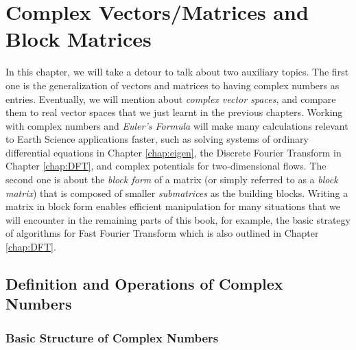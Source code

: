 \chapter{Complex Vectors/Matrices and Block Matrices}
\label{chap:complex}

In this chapter, we will take a detour to talk about two auxiliary topics. The first one is the generalization of vectors and matrices to having complex numbers as entries. Eventually, we will mention about \textit{complex vector spaces}, and compare them to real vector spaces that we just learnt in the previous chapters. Working with complex numbers and \textit{Euler's Formula} will make many calculations relevant to Earth Science applications faster, such as solving systems of ordinary differential equations in Chapter \ref{chap:eigen}, the Discrete Fourier Transform in Chapter \ref{chap:DFT}, and complex potentials for two-dimensional flows. The second one is about the \textit{block form} of a matrix (or simply referred to as a \textit{block matrix}) that is composed of smaller \textit{submatrices} as the building blocks. Writing a matrix in block form enables efficient manipulation for many situations that we will encounter in the remaining parts of this book, for example, the basic strategy of algorithms for Fast Fourier Transform which is also outlined in Chapter \ref{chap:DFT}.

\section{Definition and Operations of Complex Numbers}
\label{section:complexno}

\subsection{Basic Structure of Complex Numbers} 

